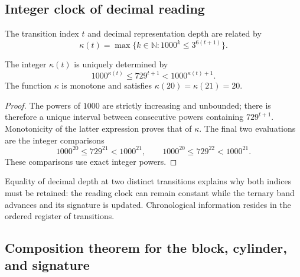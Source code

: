 

\subsection{Integer clock of decimal reading}

\begin{definition}
The transition index \(t\) and decimal representation depth are related by
\begin{equation}
 \kappa(t)=\max\{k\in\mathbb N:1000^k\leq3^{6(t+1)}\}.
 \label{act21:eq:df-reloj}
\end{equation}
\end{definition}

\begin{proposition}
\label{act21:prop:df-reloj}
The integer \(\kappa(t)\) is uniquely determined by
\begin{equation}
 1000^{\kappa(t)}\leq729^{t+1}<1000^{\kappa(t)+1}.
 \label{act21:eq:df-reloj-cotas}
\end{equation}
The function \(\kappa\) is monotone and satisfies
\(\kappa(20)=\kappa(21)=20\).
\end{proposition}

\begin{proof}
The powers of \(1000\) are strictly increasing and unbounded; there is
therefore a unique interval between consecutive powers containing
\(729^{t+1}\). Monotonicity of the latter expression proves that of
\(\kappa\). The final two evaluations are the integer comparisons
\[
 1000^{20}\leq729^{21}<1000^{21},\qquad
 1000^{20}\leq729^{22}<1000^{21}.
\]
These comparisons use exact integer powers.
\end{proof}

Equality of decimal depth at two distinct transitions explains why both
indices must be retained: the reading clock can remain constant while
the ternary band advances and its signature is updated. Chronological
information resides in the ordered register of transitions.

\subsection{Composition theorem for the block, cylinder, and signature}

